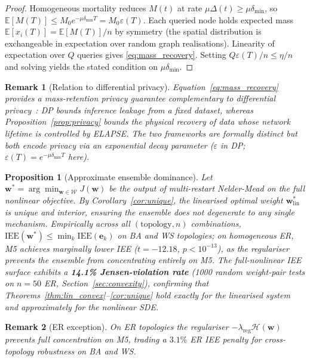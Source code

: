 \documentclass[review,12pt]{elsarticle}
\newcommand{\bfw}{\mathbf{w}}
\newcommand{\IEE}{\mathrm{IEE}}
\newtheorem{proposition}{Proposition}
\newtheorem{remark}{Remark}
\begin{document}
\begin{proof}
Homogeneous mortality reduces $M(t)$ at rate $\mu\Delta(t) \geq \mu\delta_{\min}$,
so $\mathbb{E}[M(T)] \leq M_0 e^{-\mu\delta_{\min}T} = M_0\varepsilon(T)$.
Each queried node holds expected mass $\mathbb{E}[x_i(T)] = \mathbb{E}[M(T)]/n$
by symmetry (the spatial distribution is exchangeable in expectation over
random graph realisations).  Linearity of expectation over $Q$ queries
gives \eqref{eq:mass_recovery}.  Setting $Q\varepsilon(T)/n \leq \eta/n$
and solving yields the stated condition on $\mu\delta_{\min}$.
\end{proof}

\begin{remark}[Relation to differential privacy]
\label{rem:dp}
Equation~\eqref{eq:mass_recovery} provides a \emph{mass-retention} privacy
guarantee complementary to differential privacy~\cite{dwork2014algorithmic}:
DP bounds inference leakage from a fixed dataset, whereas
Proposition~\ref{prop:privacy} bounds the \emph{physical recovery} of data
whose network lifetime is controlled by ELAPSE.  The two frameworks are
formally distinct but both encode privacy via an exponential decay parameter
($\varepsilon$ in DP; $\varepsilon(T)=e^{-\mu\delta_{\min}T}$ here).
\end{remark}

\begin{proposition}[Approximate ensemble dominance]
\label{prop:dominance}
Let $\bfw^* = \arg\min_{\bfw \in \mathcal{W}} J(\bfw)$ be the output of
multi-restart Nelder-Mead on the full nonlinear objective.  By
Corollary~\ref{cor:unique}, the linearised optimal weight
$\bfw^*_{\mathrm{lin}}$ is unique and interior, ensuring the ensemble
does not degenerate to any single mechanism.  Empirically across all
$(\text{topology}, n)$ combinations,
$\IEE(\bfw^*) \leq \min_k \IEE(\mathbf{e}_k)$ on BA and WS topologies;
on homogeneous ER, M5 achieves marginally lower IEE ($t=-12.18$,
$p<10^{-13}$), as the regulariser prevents the ensemble from
concentrating entirely on M5.  The full-nonlinear IEE surface
exhibits a \textbf{14.1\% Jensen-violation rate} (1000 random
weight-pair tests on $n=50$ ER, Section~\ref{sec:convexity}),
confirming that Theorems~\ref{thm:lin_convex}--\ref{cor:unique}
hold exactly for the linearised system and approximately for
the nonlinear SDE.
\end{proposition}

\begin{remark}[ER exception]
\label{rem:er_exception}
On ER topologies the regulariser $-\lambda_{\mathrm{reg}}\mathcal{H}(\bfw)$
prevents full concentration on M5, trading a $3.1\%$ ER IEE penalty
for cross-topology robustness on BA and WS.
\end{remark}
\end{document}
